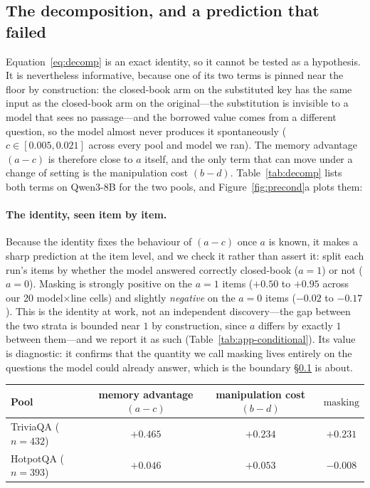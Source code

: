 \documentclass[11pt]{article}
\newcommand{\mask}{\ensuremath{\mathrm{masking}}}
\begin{document}
\subsection{The decomposition, and a prediction that failed}
\label{sec:precond}
Equation~\eqref{eq:decomp} is an exact identity, so it cannot be tested as a hypothesis. It
is nevertheless informative, because one of its two terms is pinned near the floor by
construction: the closed-book arm on the substituted key has the same input as the
closed-book arm on the original---the substitution is invisible to a model that sees no
passage---and the borrowed value comes from a different question, so the model almost never
produces it spontaneously ($c \in [0.005, 0.021]$ across every pool and model we ran). The memory advantage
$(a-c)$ is therefore close to $a$ itself, and the only term that can move under a change of
setting is the manipulation cost $(b-d)$. Table~\ref{tab:decomp} lists both terms on
Qwen3-8B for the two pools, and Figure~\ref{fig:precond}a plots them:

\paragraph{The identity, seen item by item.} Because the identity fixes the behaviour of
$(a-c)$ once $a$ is known, it makes a sharp prediction at the item level, and we check it
rather than assert it: split each run's items by whether the model answered correctly
closed-book ($a{=}1$) or not ($a{=}0$). Masking is strongly positive on the $a{=}1$ items
($+0.50$ to $+0.95$ across our 20 model$\times$line cells) and slightly \emph{negative} on
the $a{=}0$ items ($-0.02$ to $-0.17$). This is the identity at work, not an independent
discovery---the gap between the two strata is bounded near $1$ by construction, since $a$
differs by exactly $1$ between them---and we report it as such
(Table~\ref{tab:app-conditional}). Its value is diagnostic: it confirms that the quantity we
call masking lives entirely on the questions the model could already answer, which is the
boundary \S\ref{sec:precond} is about.

\begin{center}\small
{}
\label{tab:decomp}
\begin{tabular}{lccc}
\toprule
Pool & memory advantage $(a-c)$ & manipulation cost $(b-d)$ & \mask \\
\midrule
TriviaQA ($n{=}432$) & $+0.465$ & $+0.234$ & $\mathbf{+0.231}$ \\
HotpotQA ($n{=}393$) & $+0.046$ & $+0.053$ & $\mathbf{-0.008}$ \\
\bottomrule
\end{tabular}
\end{center}
\end{document}
